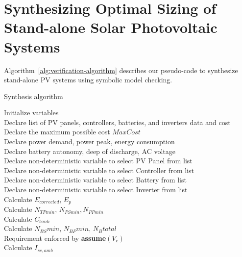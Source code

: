 \documentclass[review]{elsarticle}
\begin{document}
\section{Synthesizing Optimal Sizing of Stand-alone Solar Photovoltaic Systems}
Algorithm~\ref{alg:verification-algorithm} describes our pseudo-code to synthesize stand-alone PV systems using symbolic model checking. 
%
 \begin{algorithm}
 \caption{Synthesis algorithm}
 \begin{algorithmic}[1]
 \renewcommand{\algorithmicrequire}{\textbf{Input:}}
 \renewcommand{\algorithmicensure}{\textbf{Output:}}
  \STATE Initialize variables \\
  \STATE Declare list of PV panels, controllers, batteries, and inverters data and cost \\
  \STATE Declare the maximum possible cost $MaxCost$  \\
  \STATE Declare power demand, power peak, energy consumption \\
  \STATE Declare battery autonomy, deep of discharge, AC voltage \\
 	\STATE Declare non-deterministic variable to select PV Panel from list \\
 	\STATE Declare non-deterministic variable to select Controller from list \\
 	\STATE Declare non-deterministic variable to select Battery from list \\
 	\STATE Declare non-deterministic variable to select Inverter from list \\ 	
 	\STATE Calculate $E_{corrected}, \, E_{p} $ \\
	\STATE Calculate $N_{TPmin}, \, N_{PSmin}, N_{PPmin} $ \\
 	\STATE Calculate $C_{bank}$ \\
	\STATE Calculate $N_{BS}min, \, N_{BP}min, \, N_{B}total$ \\
	\STATE Requirement enforced by \textbf{assume}$(V_{c})$ \\
 	\STATE Calculate $I_{sc,amb}$ \\

\end{algorithmic}
\end{algorithm}
\end{document}

